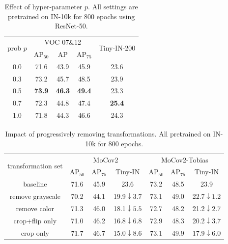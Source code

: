 \documentclass[letterpaper]{article} %
\def\pt{\phantom{0}}
\begin{document}
\begin{table}
	\caption{Effect of hyper-parameter $p$. All settings are pretrained on IN-10k for 800 epochs using ResNet-50.}
	\label{tab:hyperparameter}
	\centering
	\small
	\renewcommand{\arraystretch}{0.9}
	\renewcommand{\multirowsetup}{\centering}
	\begin{tabular}{c|ccc|c}
		\hline
		\multirow{2}{*}{prob $p$}         &           \multicolumn{3}{c|}{VOC 07\&12}    &\multirow{2}{*}{Tiny-IN-200}         \\ 
		\cline{2-4}
		& $\text{AP}_{50}$ & $\text{AP}$ & $\text{AP}_{75}$ &\\
		\hline
		0.0	 &     71.6      &  43.9       &  45.9      &  23.6    \\
		0.3	 &     73.2     &  45.7       &  48.5      &  23.9    \\
		0.5	 &     \textbf{73.9}     &  \textbf{46.3}       &  \textbf{49.4}      &  23.3    \\
		0.7	 &     72.3     &  44.8       &  47.4      &  \textbf{25.4}    \\
		1.0 &       71.8      & 44.3&46.6&24.3\\
		\hline
	\end{tabular}
\end{table}

\begin{table}
	\caption{Impact of progressively removing transformations. All pretrained on IN-10k for 800 epochs.}
	\label{tab:transformation}
	\centering
	\small
	\setlength{\tabcolsep}{2pt}
	\renewcommand{\arraystretch}{0.95}
	\renewcommand{\multirowsetup}{\centering}
	\begin{tabular}{c|ccc|ccc}
		\hline
		\multirow{2}{*}{transformation set}         &           \multicolumn{3}{c|}{MoCov2}    &\multicolumn{3}{c}{MoCov2-Tobias}         \\ 
		\cline{2-7}
		& $\text{AP}_{50}$ &  $\text{AP}_{75}$ &Tiny-IN & $\text{AP}_{50}$ & $\text{AP}_{75}$ &Tiny-IN\\
		\hline
		baseline	 &     71.6          &   45.9      &   23.6\tiny{\pt\pt\pt\pt\pt} &73.2&48.5&23.9\tiny{\pt\pt\pt\pt\pt} \\
		remove grayscale	 &   70.2          &   44.1    &      19.9\tiny$\downarrow3.7$&73.1&49.0&22.7\tiny$\downarrow1.2$\\
		remove color 	 &   71.3            &  46.0       &18.1\tiny$\downarrow5.5$   &72.7&48.2&21.2\tiny$\downarrow2.7$ \\
		crop+flip only &    71.0   &46.2 & 16.8\tiny$\downarrow6.8$&72.9&48.3& 20.2\tiny$\downarrow3.7$\\
		crop only &71.7&46.7&15.0\tiny$\downarrow8.6$&73.1&49.9&17.9\tiny$\downarrow6.0$\\
		\hline
	\end{tabular}
\end{table}
\end{document}
